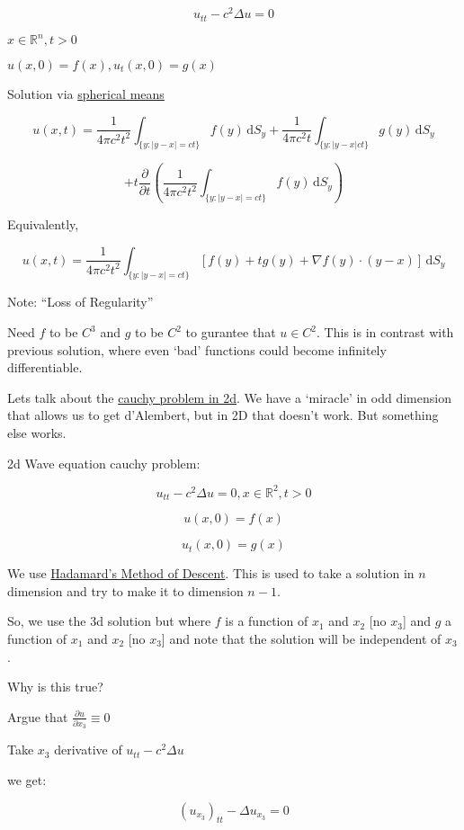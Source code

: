 \documentclass{article}
\theoremstyle{definition}
\begin{document}
\[
    u_{t t} - c^2 \Delta u = 0
\]

\(x\in\mathbb{R} ^n, t > 0\) 

\(u(x,0) = f(x), u_t(x,0)=g(x)\) 

Solution via \underline{spherical means}

\[
    u(x,t) = \frac{1}{4\pi c^2 t^2} \int_{\{ y: \vert y -x \vert = ct \} }^{} f(y) \,\mathrm{d}S_y + \frac{1}{4 \pi c^2 t} \int_{\{ y: \vert y - x \vert ct \} }^{} g(y) \,\mathrm{d}S_y
\]

\[
    + t \frac{\partial}{\partial t} \left( \frac{1}{4\pi c^2 t^2} \int_{\{ y : \vert y - x \vert = ct \} }^{} f(y) \,\mathrm{d}S_y \right) 
\]

Equivalently,

\[
    u(x,t) = \frac{1}{4\pi  c^2 t^2} \int_{\{ y : \vert y - x \vert = ct \} }^{} \left[ f(y) + t g (y) + \nabla f(y)\cdot (y-x) \right]  \,\mathrm{d}S_y 
\]

Note: ``Loss of Regularity''

Need \(f\) to be \(C^3\) and \(g\) to be \(C^2\) to gurantee that \(u\in C^2\). This is in contrast with previous solution, where even `bad' functions could become infinitely differentiable.

Lets talk about the \underline{cauchy problem in 2d}. We have a `miracle' in odd dimension that allows us to get d'Alembert, but in 2D that doesn't work. But something else works.

2d Wave equation cauchy problem:

\[
    u_{t t} - c^2 \Delta u = 0, x\in \mathbb{R} ^2, t > 0
\]

\[
    u(x,0) = f(x)
\]

\[
    u_t(x,0) = g(x)
\]

We use \underline{Hadamard's Method of Descent}. This is used to take a solution in \(n\) dimension and try to make it to dimension \(n-1\).

So, we use the 3d solution but where \(f\) is a function of \(x_1\) and \(x_2\) [no \(x_3\)] and \(g\) a function of \(x_1\) and \(x_2\) [no \(x_3\)] and note that the solution will be independent of \(x_3\).

Why is this true?

Argue that \(\frac{\partial u}{\partial x_3} \equiv 0 \)

Take \(x_3\) derivative of \(u_{t t} - c^2 \Delta u\) 

we get:

\[
    (u_{x_3})_{t t} - \Delta u_{x_3} = 0
\]
\end{document}
